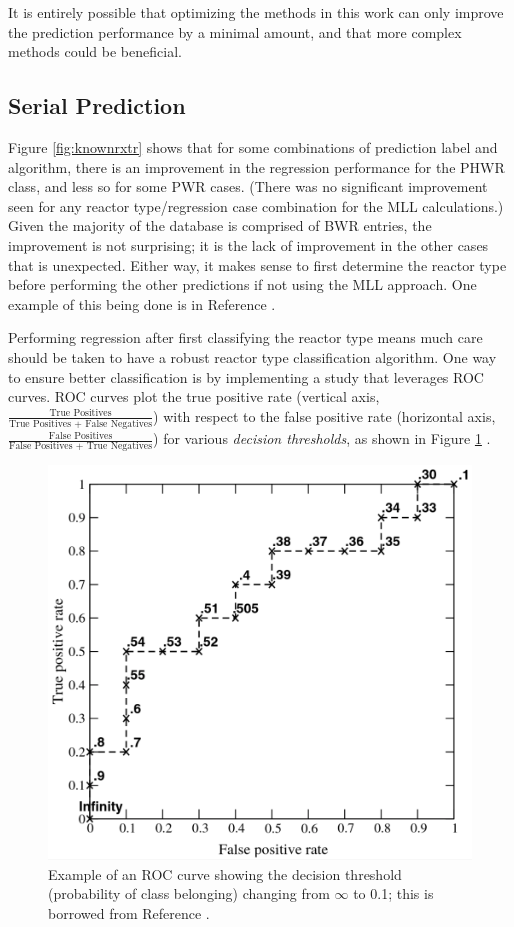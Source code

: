 It is entirely possible that optimizing the methods in this work can only
improve the prediction performance by a minimal amount, and that more complex
methods could be beneficial. 

\subsection{Serial Prediction}

Figure \ref{fig:knownrxtr} shows that for some combinations of prediction label
and algorithm, there is an improvement in the regression performance for the
\gls{PHWR} class, and less so for some \gls{PWR} cases.  (There was no
significant improvement seen for any reactor type/regression case combination
for the \gls{MLL} calculations.) Given the majority of the database is
comprised of \gls{BWR} entries, the improvement is not surprising; it is the
lack of improvement in the other cases that is unexpected. Either way, it makes
sense to first determine the reactor type before performing the other
predictions if not using the \gls{MLL} approach. One example of this being
done is in Reference \cite{serial_ml}.

Performing regression after first classifying the reactor type means much care
should be taken to have a robust reactor type classification algorithm. One way
to ensure better classification is by implementing a study that leverages
\gls{ROC} curves. \Gls{ROC} curves plot the true positive rate (vertical axis,
$\frac{\text{True Positives}}{\text{True Positives + False Negatives}}$) with
respect to the false positive rate (horizontal axis, $\frac{\text{False
Positives}}{\text{False Positives + True Negatives}}$) for various
\textit{decision thresholds}, as shown in Figure \ref{fig:roc} \cite{roc}.

\begin{figure}[!htb]
  \centering
  \includegraphics[width=0.8\linewidth]{./chapters/concl/roc.png}
  \caption[Example of an \acrshort{ROC} curve]
          {Example of an \acrshort{ROC} curve showing the decision threshold 
           (probability of class belonging) changing from $\infty$ to 0.1; this 
           is borrowed from Reference \cite{roc}.}
  \label{fig:roc}
\end{figure}

